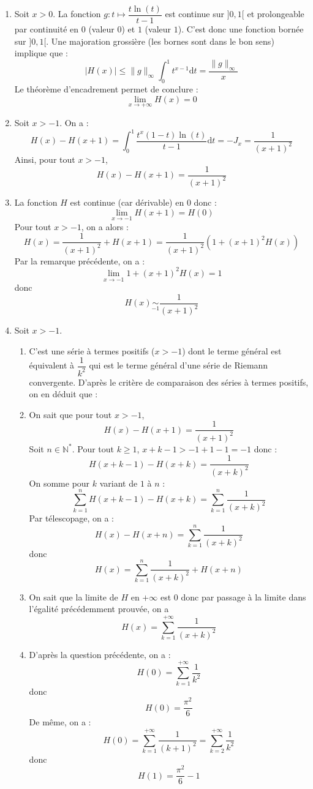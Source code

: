 \documentclass[twoside,french,11pt]{VcCours}
\newcommand{\enc}[1]{\fbox{#1}}
\newcommand{\dt}{\text{d}t}
\begin{document}
\begin{enumerate}
\begin{enumerate}
  \item Soit $x>0$. La fonction $g : t\mapsto \dfrac{t\ln(t)}{t-1}$ est continue sur $]0,1[$ et prolongeable par continuité en $0$ (valeur $0$) et $1$ (valeur $1$). C'est donc une fonction bornée sur $]0,1[$. Une majoration grossière (les bornes sont dans le bon sens) implique que :
  \[ |H(x)|\leq \|g\|_\infty \int_0^1t^{x-1}\dt=\frac{\|g\|_\infty}{x}\]
  Le théorème d'encadrement permet de conclure :
  \[\lim_{x\to +\infty}H(x)=0\]
  
  \item Soit $x>-1$. On a :
  $$H(x)-H(x+1)=\int_0^1\frac{t^x(1-t)\ln(t)}{t-1}\dt=-J_x=\frac{1}{(x+1)^2}$$
  Ainsi, pour tout $x>-1$,
  \[\boxed{ H(x)-H(x+1)=\frac{1}{(x+1)^2}}\]
  \item La fonction $H$ est continue (car dérivable) en $0$ donc :
  $$ \lim_{x \rightarrow -1} H(x+1) = H(0)$$
  Pour tout $x>-1$, on a alors :
  $$ H(x) = \dfrac{1}{(x+1)^2} + H(x+1) = \dfrac{1}{(x+1)^2} ( 1 + (x+1)^2 H(x))$$
  Par la remarque précédente, on a :
  $$ \lim_{x \rightarrow -1} 1 + (x+1)^2 H(x) = 1$$
  donc 
  $$ \boxed{ H(x) \underset{-1}{\sim}\dfrac{1}{(x+1)^2}}$$
  \item Soit $x>-1$.
  \begin{enumerate}
  \item C'est une série à termes positifs ($x>-1$) dont le terme général est équivalent à $\dfrac{1}{k^2}$ qui est le terme général d'une série de Riemann convergente. D'après le critère de comparaison des séries à termes positifs, on en déduit que :
  
  \enc{$\sum_{k\geq 1}\frac{1}{(x+k)^2}$ converge}
  \item On sait que pour tout $x>-1$,
  $$ H(x)-H(x+1)=\frac{1}{(x+1)^2}$$
  Soit $n \in \mathbb{N}^*$. Pour tout $k \geq 1$, $x+k-1 >-1+1-1=-1$ donc :
  $$ H(x+k-1)-H(x+k) = \frac{1}{(x+k)^2}$$
  On somme pour $k$ variant de $1$ à $n$ :
  $$ \sum_{k=1}^n H(x+k-1)-H(x+k) =  \sum_{k=1}^n \frac{1}{(x+k)^2}$$
  Par télescopage, on a :
  $$ H(x) - H(x+n) =  \sum_{k=1}^n \frac{1}{(x+k)^2}$$
  donc
  \[ \boxed{H(x)=\sum_{k=1}^n\frac{1}{(x+k)^2}+H(x+n)}\]
  \item On sait que la limite de $H$ en $+ \infty$ est $0$ donc par passage à la limite dans l'égalité précédemment prouvée, on a 
  \[ \boxed{H(x)=\sum_{k=1}^{+ \infty} \frac{1}{(x+k)^2}}\]
  \item D'après la question précédente, on a :
  $$ H(0) = \sum_{k=1}^{+ \infty} \dfrac{1}{k^2}$$
  donc
  $$ \boxed{ H(0) = \dfrac{\pi^2}{6}}$$
  De même, on a :
  $$ H(0) = \sum_{k=1}^{+ \infty} \dfrac{1}{(k+1)^2} = \sum_{k=2}^{+ \infty} \dfrac{1}{k^2}$$
  donc
  $$ \boxed{ H(1) = \dfrac{\pi^2}{6} -1}$$
  \end{enumerate}
  \end{enumerate}
  \end{enumerate}
  
\end{document}
